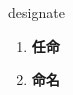 
\begin{frame}
{\huge designate}
\begin{center}
\begin{enumerate}\Large
  \item \textbf{任命}
  \item \textbf{命名}
\end{enumerate}
\end{center}
\end{frame}
